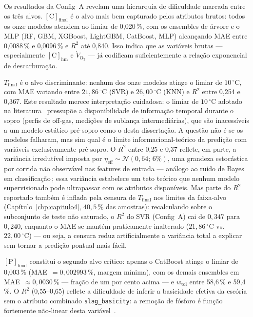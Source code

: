 Os resultados da Config~A revelam uma hierarquia de dificuldade marcada entre os três alvos. $[\text{C}]_\text{final}$ é o alvo mais bem capturado pelos atributos brutos: todos os onze modelos atendem ao limiar de 0{,}020\,\%, com os ensembles de árvore e o MLP (RF, GBM, XGBoost, LightGBM, CatBoost, MLP) alcançando MAE entre 0{,}0088\,\% e 0{,}0096\,\% e $R^2$ até 0{,}840. Isso indica que as variáveis brutas --- especialmente $[\text{C}]_\text{hm}$ e $\dot{V}_{\text{O}_2}$ --- já codificam suficientemente a relação exponencial de descarburação.

$T_\text{final}$ é o alvo discriminante: nenhum dos onze modelos atinge o limiar de $10\,^\circ\text{C}$, com MAE variando entre $21{,}86\,^\circ\text{C}$ (SVR) e $26{,}00\,^\circ\text{C}$ (KNN) e $R^2$ entre 0{,}254 e 0{,}367. Este resultado merece interpretação cuidadosa: o limiar de $10\,^\circ\text{C}$ adotado na literatura~\cite{xia2024dmpinn,bae2020bof} pressupõe a disponibilidade de informação temporal durante o sopro (perfis de off-gas, medições de sublança intermediárias), que são inacessíveis a um modelo estático pré-sopro como o desta dissertação. A questão não é se os modelos falharam, mas sim qual é o limite informacional-teórico da predição com variáveis exclusivamente pré-sopro. O $R^2$ entre 0{,}25 e 0{,}37 reflete, em parte, a variância irredutível imposta por $\eta_\text{eff} \sim \mathcal{N}(0{,}64;\,6\%)$, uma grandeza estocástica por corrida não observável nas features de entrada --- análogo ao ruído de Bayes em classificação\,\cite{bishop2006prml,goodfellow2016deep}; essa variância estabelece um teto teórico que nenhum modelo supervisionado pode ultrapassar com os atributos disponíveis. Mas parte do $R^2$ reportado também é inflada pela censura de $T_\text{final}$ nos limites da faixa-alvo (Capítulo~\ref{chp:capitulo4}, $40{,}5\,\%$ das amostras): recalculando sobre o subconjunto de teste não saturado, o $R^2$ do SVR (Config~A) cai de $0{,}347$ para $0{,}240$, enquanto o MAE se mantém praticamente inalterado ($21{,}86\,^\circ\text{C}$ vs.\ $22{,}00\,^\circ\text{C}$) --- ou seja, a censura reduz artificialmente a variância total a explicar sem tornar a predição pontual mais fácil.

$[\text{P}]_\text{final}$ constitui o segundo alvo crítico: apenas o CatBoost atinge o limiar de 0{,}003\,\% (MAE~$=0{,}002993\,\%$, margem mínima), com os demais ensembles em MAE~$\approx 0{,}0030\,\%$ --- fração de um por cento acima --- e $w_\text{tol}$ entre 58{,}6\,\% e 59{,}4\,\%. O $R^2$ (0{,}55--0{,}65) reflete a dificuldade de inferir a basicidade efetiva da escória sem o atributo combinado \texttt{slag\_basicity}: a remoção de fósforo é função fortemente não-linear desta variável~\cite{bae2020bof,chattopadhyay2022hybrid}.

